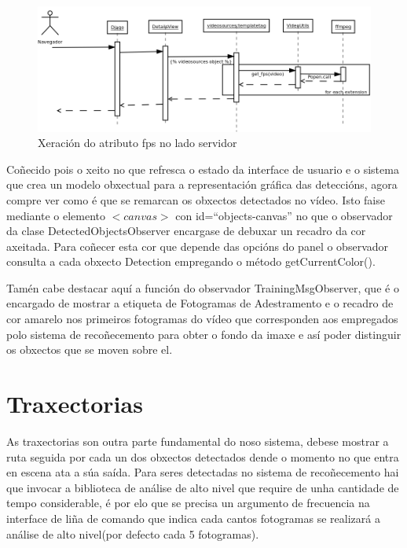     \begin{figure}[htp]
    \begin{center}
        \includegraphics[scale=0.2]{figures/GenerateFpsDjango.png}
        \caption{Xeración do atributo fps no lado servidor}
    \label{fig:GenerateFpsDjango}
    \end{center}
    \end{figure}
    
    Coñecido pois o xeito no que refresca o estado da interface de usuario e o sistema que crea un 
    modelo obxectual para a representación gráfica das deteccións, agora compre ver como é que se 
    remarcan os obxectos detectados no vídeo. Isto faise mediante o elemento $<canvas>$ con
    id=``objects-canvas'' no que o observador da clase DetectedObjectsObserver encargase de debuxar
    un recadro da cor axeitada. Para coñecer esta cor que depende das opcións do panel o observador
    consulta a cada obxecto Detection empregando o método getCurrentColor().
    
    Tamén cabe destacar aquí a función do observador TrainingMsgObserver, que é o encargado de 
    mostrar a etiqueta de Fotogramas de Adestramento e o recadro de cor amarelo nos primeiros 
    fotogramas do vídeo que corresponden aos empregados polo sistema de recoñecemento para obter o 
    fondo da imaxe e así poder distinguir os obxectos que se moven sobre el.
    
\section{Traxectorias}

    As traxectorias son outra parte fundamental do noso sistema, debese mostrar a ruta seguida por 
    cada un dos obxectos detectados dende o momento no que entra en escena ata a súa saída. Para 
    seres detectadas no sistema de recoñecemento hai que invocar a biblioteca de análise de alto 
    nivel que require de unha cantidade de tempo considerable, é por elo que se precisa un argumento
    de frecuencia na interface de liña de comando que indica cada cantos fotogramas se realizará a 
    análise de alto nivel(por defecto cada 5 fotogramas).
    
